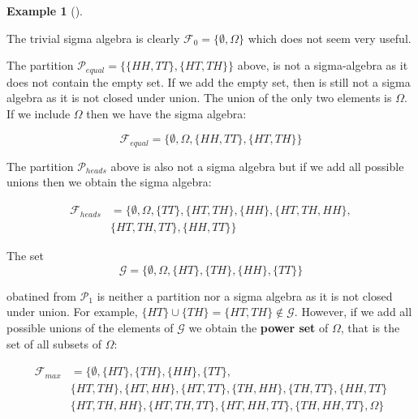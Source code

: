 \documentclass[
  letterpaper,
  DIV=11,
  numbers=noendperiod]{scrreport}
\theoremstyle{definition}
\newtheorem{example}{Example}[chapter]
\theoremstyle{plain}
\theoremstyle{plain}
\theoremstyle{definition}
\theoremstyle{remark}
\begin{document}
\begin{tcolorbox}[enhanced jigsaw, opacitybacktitle=0.6, bottomtitle=1mm, opacityback=0, toprule=.15mm, colbacktitle=quarto-callout-note-color!10!white, colback=white, left=2mm, title={Examples of sigma-algebras}, breakable, rightrule=.15mm, leftrule=.75mm, titlerule=0mm, colframe=quarto-callout-note-color-frame, arc=.35mm, coltitle=black, toptitle=1mm, bottomrule=.15mm]

\begin{example}[]\protect\hypertarget{exm-sigma-algebra}{}\label{exm-sigma-algebra}

The trivial sigma algebra is clearly
\(\mathcal F_0=\{\emptyset, \Omega\}\) which does not seem very useful.

The partition \(\mathcal P_{equal}=\{\{HH,TT\}, \{HT,TH\}\}\) above, is
not a sigma-algebra as it does not contain the empty set. If we add the
empty set, then is still not a sigma algebra as it is not closed under
union. The union of the only two elements is \(\Omega\). If we include
\(\Omega\) then we have the sigma algebra:

\[
\mathcal F_{equal}=\{\emptyset, \Omega, \{HH,TT\}, \{HT,TH\}\}
\]

The partition \(\mathcal P_{heads}\) above is also not a sigma algebra
but if we add all possible unions then we obtain the sigma algebra:

\[
\begin{aligned}
\mathcal F_{heads}& =\{\emptyset, \Omega, \{TT\}, \{HT,TH\}, \{HH\}, \{HT,TH,HH\},\\
 & \{HT,TH,TT\}, \{HH,TT\}\}
\end{aligned}
\]

The set \[
\mathcal G =\{\emptyset,\Omega,\{HT\},\{TH\},\{HH\},\{TT\}\}
\]

obatined from \(\mathcal P_1\) is neither a partition nor a sigma
algebra as it is not closed under union. For example,
\(\{HT\}\cup \{TH\}=\{HT,TH\}\notin \mathcal G\). However, if we add all
possible unions of the elements of \(\mathcal G\) we obtain the
\textbf{power set} of \(\Omega\), that is the set of all subsets of
\(\Omega\):

\[
\begin{aligned}
\mathcal F_{max} &= \{\emptyset,  \{HT\},\{TH\},\{HH\},\{TT\},\\
&  \{HT,TH\}, \{HT,HH\}, \{HT,TT\}, \{TH,HH\}, \{TH,TT\}, \{HH,TT\}\\
&  \{HT,TH,HH\}, \{HT,TH,TT\}, \{HT,HH,TT\}, \{TH,HH,TT\},\Omega \}
\end{aligned}
\]


\end{example}
\end{tcolorbox}
\end{document}
